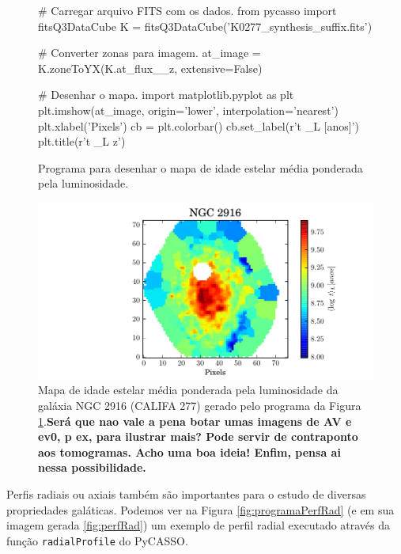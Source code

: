 \begin{figure}
\begin{python}
# Carregar arquivo FITS com os dados.
from pycasso import fitsQ3DataCube
K = fitsQ3DataCube('K0277_synthesis_suffix.fits')

# Converter zonas para imagem.
at_image = K.zoneToYX(K.at_flux__z, extensive=False)

# Desenhar o mapa.
import matplotlib.pyplot as plt
plt.imshow(at_image, origin='lower', interpolation='nearest')
plt.xlabel('Pixels')
cb = plt.colorbar()
cb.set_label(r'\langle \log t \langle_L [anos]')
plt.title(r'\langle \log t \langle_{L z}')

\end{python}
	\caption[Programa idade estelar média]
	{Programa para desenhar o mapa de idade	estelar média ponderada pela 
	luminosidade.}
	\label{fig:programaMapaIdade}
\end{figure}

\begin{figure}
	\includegraphics{figuras/at_flux_zone.pdf}
	\caption[Mapa da idade estelar média da galáxia NGC 2916] 
	{Mapa de idade estelar média ponderada pela luminosidade da galáxia NGC 2916
	(CALIFA 277) gerado pelo programa da Figura \ref{fig:programaMapaIdade}.{\bf\ojo Será que nao vale a pena botar umas
	imagens de AV e ev0, p ex, para ilustrar mais? Pode servir de contraponto aos tomogramas. Acho uma boa ideia! Enfim,
	pensa ai nessa possibilidade.} }
	\label{fig:mapaIdade}
\end{figure}

Perfis radiais ou axiais também são importantes para o estudo de diversas propriedades galáticas. Podemos ver na Figura
\ref{fig:programaPerfRad} (e em sua imagem gerada \ref{fig:perfRad}) um exemplo de perfil radial executado através da
função \texttt{radialProfile} do PyCASSO.

